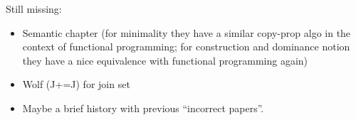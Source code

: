 Still missing:
\begin{itemize}
\item Semantic chapter (for minimality they have a similar copy-prop algo in the context of functional programming; for construction and dominance notion they have a nice equivalence with functional programming again) 
\item Wolf (J+=J) for join set
\item Maybe a brief history with previous ``incorrect papers''.
\end{itemize}
